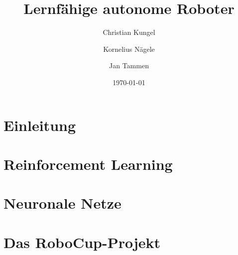 \documentclass[
	a4paper,     		%
	twoside,     		%
	headsepline, 		%
	footsepline, 		%
	titlepage,   		%
	12pt,        		%
]{scrreprt}
\title{Lernfähige autonome Roboter}
\author{%
	Christian Kungel
	\and{%
		Kornelius Nägele
	}%
	\and{%
		Jan Tammen
	}%
}%
\date{\today}
\begin{document}
\maketitle

\tableofcontents



\chapter{Einleitung}


\chapter{Reinforcement Learning}


\chapter{Neuronale Netze}


\chapter{Das RoboCup-Projekt}







\renewcommand{\bibname}{Quellen}



\end{document}
